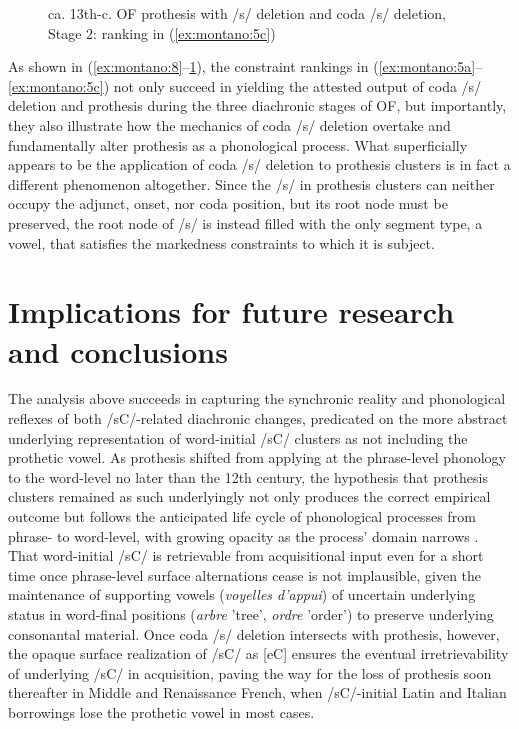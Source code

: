 \documentclass[output=paper,colorlinks,citecolor=brown,
]{langscibook}
\begin{document}
\begin{figure}
\caption{ca. 13th-c. OF prothesis with /s/ deletion and coda /s/ deletion, Stage 2: ranking in
(\ref{ex:montano:5c})}  
\label{ex:montano:10}
\end{figure}

\noindent As shown in (\ref{ex:montano:8}--\ref{ex:montano:10}), the constraint rankings in (\ref{ex:montano:5a}--\ref{ex:montano:5c}) not only succeed in yielding the attested output of coda /s/ deletion and prothesis during the three diachronic stages of OF, but importantly, they also illustrate how the mechanics of coda /s/ deletion overtake and fundamentally alter prothesis as a phonological process.  What superficially appears to be the application of coda /s/ deletion to prothesis clusters is in fact a different phenomenon altogether.  Since the /s/ in prothesis clusters can neither occupy the adjunct, onset, nor coda position, but its root node must be preserved, the root node of /s/ is instead filled with the only segment type, a vowel, that satisfies the markedness constraints to which it is subject.   

\section{Implications for future research and conclusions}
The analysis above succeeds in capturing the synchronic reality and phonological reflexes of both /sC/-related diachronic changes, predicated on the more abstract underlying representation of word-initial /sC/ clusters as not including the prothetic vowel.  As prothesis shifted from applying at the phrase-level phonology to the word-level no later than the 12th century, the hypothesis that prothesis clusters remained as such underlyingly not only produces the correct empirical outcome but follows the anticipated life cycle of phonological processes from phrase- to word-level, with growing opacity as the process' domain narrows \citep{Bermúdez-Otero2015}.  That word-initial /sC/ is retrievable from acquisitional input even for a short time once phrase-level surface alternations cease is not implausible, given the maintenance of supporting vowels (\textit{voyelles d'appui}) of uncertain underlying status in word-final positions (\textit{arbre} 'tree', \textit{ordre} 'order') to preserve underlying consonantal material.  Once coda /s/ deletion intersects with prothesis, however, the opaque surface realization of /sC/ as [eC] ensures the eventual irretrievability of underlying /sC/ in acquisition, paving the way for the loss of prothesis soon thereafter in Middle and Renaissance French, when /sC/-initial Latin and Italian borrowings lose the prothetic vowel in most cases.
		
\end{document}
